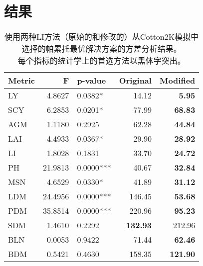 \chapter{结果}

\begin{table}
    \label{tab:stats}
    \caption{使用两种LI方法（原始的和修改的）从Cotton2K模拟中选择的帕累托最优解决方案的方差分析结果。\\每个指标的统计学上的首选方法以黑体字突出。}
    \centering
    \begin{tabular}{lrlrr}
        \toprule
        Metric & F       & p-value   & Original        & Modified        \\
        \midrule
        LY     & 4.8627  & 0.0382*   & 14.12           & \textbf{5.95}   \\
        SCY    & 6.2853  & 0.0201*   & 77.99           & \textbf{68.83}  \\
        AGM    & 1.1180  & 0.2925    & 62.28           & \textbf{44.84}  \\
        LAI    & 4.4933  & 0.0367*   & 29.90           & \textbf{28.92}  \\
        LI     & 1.8028  & 0.1831    & 33.70           & \textbf{24.72}  \\
        PH     & 21.9813 & 0.0000*** & 40.67           & \textbf{32.84}  \\
        MSN    & 4.6529  & 0.0330*   & 41.89           & \textbf{31.12}  \\
        LDM    & 24.4956 & 0.0000*** & 146.45          & \textbf{53.68}  \\
        PDM    & 35.8514 & 0.0000*** & 220.96          & \textbf{95.23}  \\
        SDM    & 1.4610  & 0.2292    & \textbf{132.93} & 212.96          \\
        BLN    & 0.0053  & 0.9422    & 71.44           & \textbf{62.46}  \\
        BDM    & 0.5421  & 0.4630    & 158.35          & \textbf{121.90} \\
        \bottomrule
    \end{tabular}
\end{table}
